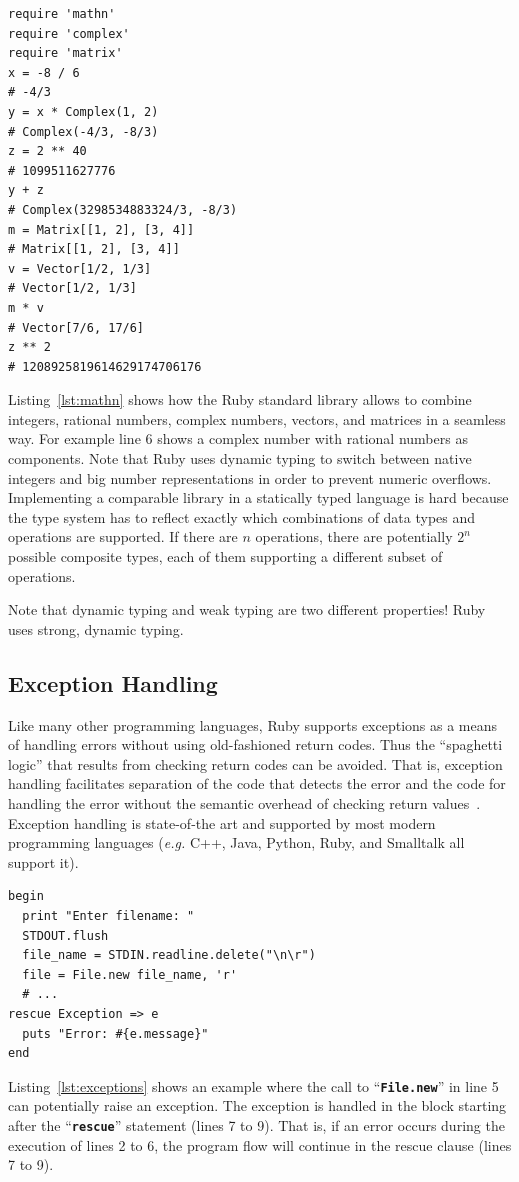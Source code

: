 \documentclass[12pt,a4paper,oneside,openright]{book}
\newcommand{\eg}{\emph{e.g.} }
\newcommand{\Eg}{For example }
\newcommand{\Ie}{That is, }
\newcommand{\lst}[1]{Listing~\ref{lst:#1}}
\newcommand{\code}[1]{``\texttt{\textbf{\textcolor{codegray}{\small{#1}}}}''}
\begin{document}
\begin{CJK}{UTF8}{}
\lstset{language=Ruby,frame=single,numbers=left}
\begin{lstlisting}[float,caption={Numerical types in Ruby},label=lst:mathn]
require 'mathn'
require 'complex'
require 'matrix'
x = -8 / 6                        
# -4/3
y = x * Complex(1, 2)             
# Complex(-4/3, -8/3)
z = 2 ** 40                       
# 1099511627776
y + z                             
# Complex(3298534883324/3, -8/3)
m = Matrix[[1, 2], [3, 4]]        
# Matrix[[1, 2], [3, 4]]
v = Vector[1/2, 1/3]              
# Vector[1/2, 1/3]
m * v                             
# Vector[7/6, 17/6]
z ** 2                            
# 1208925819614629174706176
\end{lstlisting}
\lst{mathn} shows how the Ruby standard library allows to combine integers, rational numbers, complex numbers, vectors, and matrices in a seamless way. \Eg line 6 shows a complex number with rational numbers as components. Note that Ruby uses dynamic typing to switch between native integers and big number representations in order to prevent numeric overflows. Implementing a comparable library in a statically typed language is hard because the type system has to reflect exactly which combinations of data types and operations are supported. If there are $n$ operations, there are potentially $2^n$ possible composite types, each of them supporting a different subset of operations.

Note that dynamic typing and weak typing are two different properties! Ruby uses strong, dynamic typing.

\subsection{Exception Handling}
Like many other programming languages, Ruby supports exceptions as a means of handling errors without using old-fashioned return codes. Thus the ``spaghetti logic'' that results from checking return codes can be avoided. \Ie exception handling facilitates separation of the code that detects the error and the code for handling the error without the semantic overhead of checking return values~\citep{RefWorks:541}. Exception handling is state-of-the art and supported by most modern programming languages (\eg C++, Java, Python, Ruby, and Smalltalk all support it).

\lstset{language=Ruby,frame=single,numbers=left}
\begin{lstlisting}[float=htbp,caption={Exception handling in Ruby},label=lst:exceptions]
begin
  print "Enter filename: "
  STDOUT.flush
  file_name = STDIN.readline.delete("\n\r")
  file = File.new file_name, 'r'
  # ...
rescue Exception => e
  puts "Error: #{e.message}"
end
\end{lstlisting}
\lst{exceptions} shows an example where the call to \code{File.new} in line 5 can potentially raise an exception. The exception is handled in the block starting after the \code{res\-cue} statement (lines 7 to 9). \Ie if an error occurs during the execution of lines 2 to 6, the program flow will continue in the rescue clause (lines 7 to 9).


\end{CJK}
\end{document}
